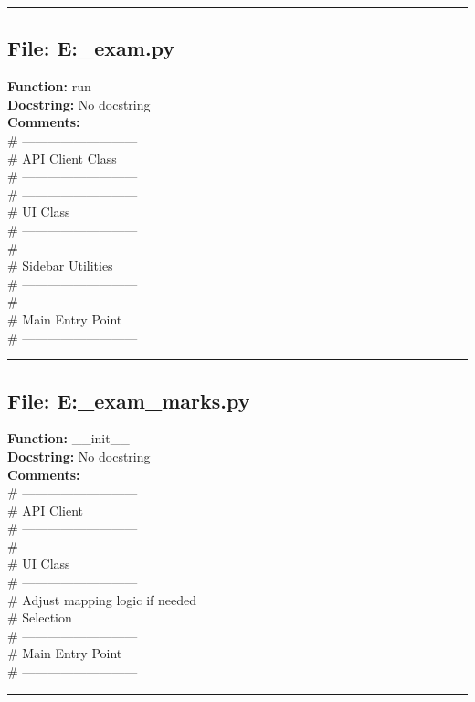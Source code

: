 {\hrule

\subsection*{File: E:\project\capstone\frontend\faculty\mst_exam.py}
\textbf{Function:} run\\
\textbf{Docstring:} No docstring\\
\textbf{Comments:}\\
# ---------------------------\\
# API Client Class\\
# ---------------------------\\
# ---------------------------\\
# UI Class\\
# ---------------------------\\
# ---------------------------\\
# Sidebar Utilities\\
# ---------------------------\\
# ---------------------------\\
# Main Entry Point\\
# ---------------------------\\

\hrule

\subsection*{File: E:\project\capstone\frontend\faculty\mst_exam_marks.py}
\textbf{Function:} __init__\\
\textbf{Docstring:} No docstring\\
\textbf{Comments:}\\
# ---------------------------\\
# API Client\\
# ---------------------------\\
# ---------------------------\\
# UI Class\\
# ---------------------------\\
# Adjust mapping logic if needed\\
# Selection\\
# ---------------------------\\
# Main Entry Point\\
# ---------------------------\\

\hrule

}
